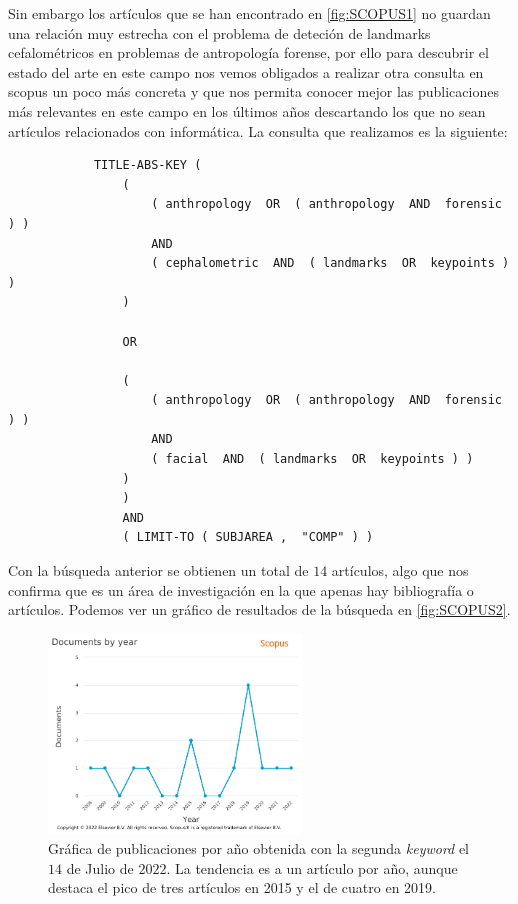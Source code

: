         \medskip

        \noindent Sin embargo los artículos que se han encontrado en \autoref{fig:SCOPUS1} no guardan una relación muy estrecha con el problema de deteción de landmarks cefalométricos en problemas de antropología forense, por ello para descubrir el estado del arte en este campo nos vemos obligados a realizar otra consulta en scopus un poco más concreta y que nos permita conocer mejor las publicaciones más relevantes en este campo en los últimos años descartando los que no sean artículos relacionados con informática. La consulta que realizamos es la siguiente: 

        \begin{verbatim}
            TITLE-ABS-KEY ( 
                ( 
                    ( anthropology  OR  ( anthropology  AND  forensic ) )  
                    AND  
                    ( cephalometric  AND  ( landmarks  OR  keypoints ) ) 
                )  
                
                OR  
                
                ( 
                    ( anthropology  OR  ( anthropology  AND  forensic ) )  
                    AND  
                    ( facial  AND  ( landmarks  OR  keypoints ) ) 
                ) 
                )  
                AND  
                ( LIMIT-TO ( SUBJAREA ,  "COMP" ) )
        \end{verbatim}

        \medskip

        \noindent Con la búsqueda anterior se obtienen un total de $14$ artículos, algo que nos confirma que es un área de investigación en la que apenas hay bibliografía o artículos. Podemos ver un gráfico de resultados de la búsqueda en \autoref{fig:SCOPUS2}.

        \begin{figure}[htpb]
            \centering
            \includegraphics[width=0.6\textwidth]{img/Scopus_2.png}
            \caption{Gráfica de publicaciones por año obtenida con la segunda \textit{keyword} el $14$ de Julio de $2022$. La tendencia es a un artículo por año, aunque destaca el pico de tres artículos en 2015 y el de cuatro en 2019.}
            \label{fig:SCOPUS2}
        \end{figure}

